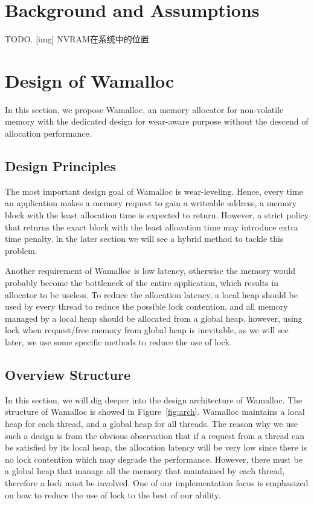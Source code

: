 \documentclass{vldb}
\begin{document}
\section{Background and Assumptions}

TODO.
[img] NVRAM在系统中的位置

\section{Design of Wamalloc}

In this section, we propose Wamalloc, an memory allocator for non-volatile memory with the dedicated design for wear-aware purpose without the descend of allocation performance.

\subsection{Design Principles}

The most important design goal of Wamalloc is wear-leveling. 
Hence, every time an application makes a memory request to gain a writeable address, 
a memory block with the least allocation time is expected to return.
However, a strict policy that returns the exact block with the least allocation time may introduce extra time penalty.
ln the later section we will see a hybrid method to tackle this problem.

Another requirement of Wamalloc is low latency,
otherwise the memory would probably become the bottleneck of the entire application,
which results in allocator to be useless. 
To reduce the allocation latency, a local heap should be used by every thread to reduce the possible lock contention,
and all memory managed by a local heap should be allocated from a global heap.
however, using lock when request/free memory from global heap is inevitable,
as we will see later, we use some specific methods to reduce the use of lock.

\subsection{Overview Structure}

In this section, we will dig deeper into the design architecture of Wamalloc.
The structure of Wamalloc is showed in Figure~\ref{fig:arch}.
Wamalloc maintains a local heap for each thread, and a global heap for all threads.
The reason why we use such a design is from the obvious observation that if a request from a thread can be satisfied by its local heap,
the allocation latency will be very low since there is no lock contention which may degrade the performance.
However, there must be a global heap that manage all the memory that maintained by each thread,
therefore a lock must be involved. One of our implementation focus is emphasized on how to reduce the use of lock to the best of our ability.
\end{document}
